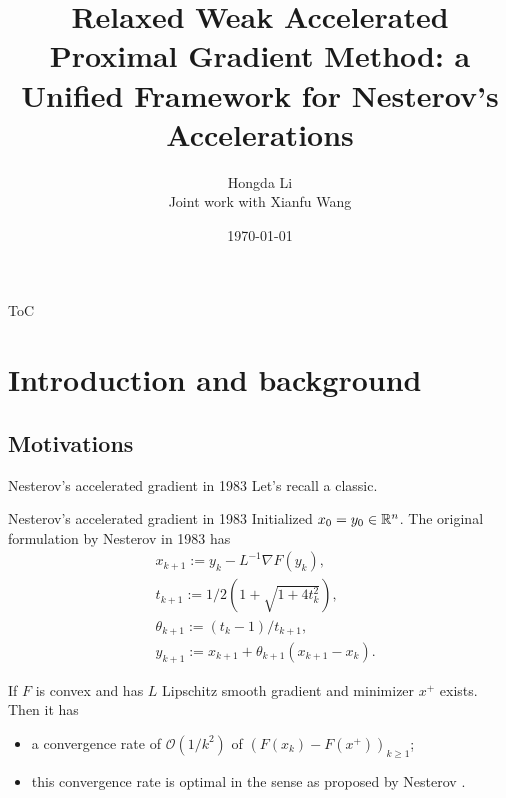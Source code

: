\documentclass[11pt]{beamer}
\author[Hongda Li]{Hongda Li\\ \vspace{1cm} \tiny{Joint work with Xianfu Wang}}
\title[Thesis Proposal Talk]{
    Relaxed Weak Accelerated Proximal Gradient Method: a Unified Framework for Nesterov's Accelerations
}
\institute[UBCO]{
    University of British Columbia Okanagan
}
\date{\today}
\theoremstyle{definition}
\begin{document}
\begin{frame}
    \titlepage
\end{frame}

\begin{frame}{ToC}
    \tableofcontents
\end{frame}

\section{Introduction and background}
    \subsection{Motivations}
        \begin{frame}{Nesterov's accelerated gradient in 1983}
            Let's recall a classic. 
            \begin{block}{Nesterov's accelerated gradient in 1983}
                Initialized $x_0 = y_0 \in \mathbb R^n$. 
                The original formulation by Nesterov in 1983 \cite{nesterov_method_1983} has
                {\small
                \begin{align*}
                    & x_{k + 1} := y_k - L^{-1}\nabla F(y_k),
                    \\
                    & t_{k + 1} := 1/2\left(1 + \sqrt{1 + 4t_{k}^2}\right),
                    \\
                    & \theta_{k + 1} := (t_{k} - 1)/t_{k + 1}, \label{eqn:example-algorithm}
                    \\
                    & y_{k + 1} := x_{k + 1} + \theta_{k + 1}(x_{k + 1} - x_k).
                \end{align*}    
                }
            \end{block}
            If $F$ is convex and has $L$ Lipschitz smooth gradient and minimizer $x^+$ exists. 
            Then it has
            \begin{itemize}
                \item a convergence rate of $\mathcal O(1/k^2)$ of $(F(x_k) - F(x^+))_{k \ge 1}$;
                \item this convergence rate is optimal in the sense as proposed by Nesterov \cite{nesterov_lectures_2018}.
            \end{itemize}
        \end{frame}
\end{document}
